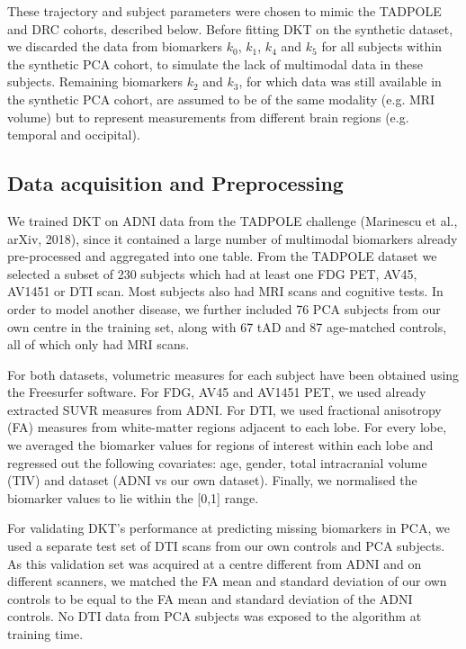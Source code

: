 \documentclass{llncs}
\begin{document}
These trajectory and subject parameters were chosen to mimic the TADPOLE and DRC cohorts, described below. Before fitting DKT on the synthetic dataset, we discarded the data from biomarkers $k_0$, $k_1$, $k_4$ and $k_5$ for all subjects within the synthetic PCA cohort, to simulate the lack of multimodal data in these subjects. Remaining biomarkers $k_2$ and $k_3$, for which data was still available in the synthetic PCA cohort, are assumed to be of the same modality (e.g. MRI volume) but to represent measurements from different brain regions (e.g. temporal and occipital). 


\subsection{Data acquisition and Preprocessing}

We trained DKT on ADNI data from the TADPOLE challenge (Marinescu et al., arXiv, 2018), since it contained a large number of multimodal biomarkers already pre-processed and aggregated into one table. From the TADPOLE dataset we selected a subset of 230 subjects which had at least one FDG PET, AV45, AV1451 or DTI scan. Most subjects also had MRI scans and cognitive tests. In order to model another disease, we further included 76 PCA subjects from our own centre in the training set, along with 67 tAD and 87 age-matched controls, all of which only had MRI scans.
 
For both datasets, volumetric measures for each subject have been obtained using the Freesurfer software. For FDG, AV45 and AV1451 PET, we used already extracted SUVR measures from ADNI. For DTI, we used fractional anisotropy (FA) measures from white-matter regions adjacent to each lobe. For every lobe, we averaged the biomarker values for regions of interest within each lobe and regressed out the following covariates: age, gender, total intracranial volume (TIV) and dataset (ADNI vs our own dataset). Finally, we normalised the biomarker values to lie within the [0,1] range. 

For validating DKT's performance at predicting missing biomarkers in PCA, we used a separate test set of DTI scans from our own controls and PCA subjects. As this validation set was acquired at a centre different from ADNI and on different scanners, we matched the FA mean and standard deviation of our own controls to be equal to the FA mean and standard deviation of the ADNI controls. No DTI data from PCA subjects was exposed to the algorithm at training time.
\end{document}
